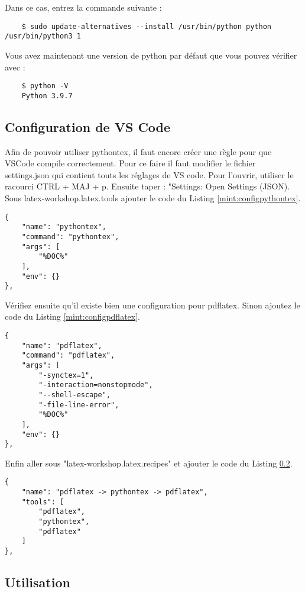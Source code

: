 Dans ce cas, entrez la commande suivante :
\begin{verbatim}
	$ sudo update-alternatives --install /usr/bin/python python /usr/bin/python3 1
\end{verbatim}

Vous avez maintenant une version de python par défaut que vous pouvez vérifier avec :
\begin{verbatim}
	$ python -V
	Python 3.9.7
\end{verbatim}

\subsection{Configuration de VS Code}
Afin de pouvoir utiliser pythontex, il faut encore créer une règle pour que VSCode compile correctement.
Pour ce faire il faut modifier le fichier settings.json qui contient touts les réglages de VS code.
Pour l'ouvrir, utiliser le racourci CTRL + MAJ + p.
Ensuite taper : "Settings: Open Settings (JSON).
Sous latex-workshop.latex.tools ajouter le code du Listing \ref{mint:configpythontex}.

\begin{listing}[H]
	\begin{verbatim}
{
	"name": "pythontex",
	"command": "pythontex",
	"args": [
		"%DOC%"
	],
	"env": {}
},
	\end{verbatim}
	\caption{Configuration de pythonrex}
	\label{mint:configpythontex}
\end{listing}

Vérifiez ensuite qu'il existe bien une configuration pour pdflatex.
Sinon ajoutez le code du Listing \ref{mint:configpdflatex}.

\begin{listing}[H]
	\begin{verbatim}
{
	"name": "pdflatex",
	"command": "pdflatex",
	"args": [
		"-synctex=1",
		"-interaction=nonstopmode",
		"--shell-escape",
		"-file-line-error",
		"%DOC%"
	],
	"env": {}
},
	\end{verbatim}
	\caption{Configuration de pdflatex}
	\label{mint:configpdflatex}
\end{listing}

Enfin aller sous "latex-workshop.latex.recipes" et ajouter le code du Listing \ref{}.

\begin{listing}[H]
	\begin{verbatim}
{
	"name": "pdflatex -> pythontex -> pdflatex",
	"tools": [
		"pdflatex",
		"pythontex",
		"pdflatex"
	]
},
	\end{verbatim}
	\caption{Configuration de la recette}
	\label{mint:recette}
\end{listing}

\subsection{Utilisation}